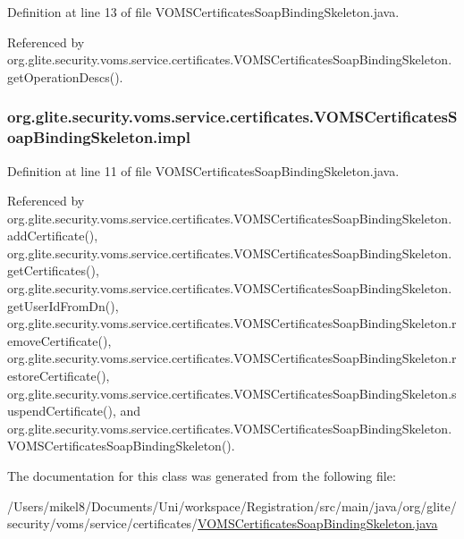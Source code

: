 Definition at line 13 of file VOMSCertificatesSoapBindingSkeleton.java.



Referenced by org.glite.security.voms.service.certificates.VOMSCertificatesSoapBindingSkeleton.getOperationDescs().

\hypertarget{classorg_1_1glite_1_1security_1_1voms_1_1service_1_1certificates_1_1VOMSCertificatesSoapBindingSkeleton_a2d621dce09a90972e8409a0dc9936638}{
\subsubsection[{impl}]{ {\bf org.glite.security.voms.service.certificates.VOMSCertificatesSoapBindingSkeleton.impl}}}
\label{classorg_1_1glite_1_1security_1_1voms_1_1service_1_1certificates_1_1VOMSCertificatesSoapBindingSkeleton_a2d621dce09a90972e8409a0dc9936638}


Definition at line 11 of file VOMSCertificatesSoapBindingSkeleton.java.



Referenced by org.glite.security.voms.service.certificates.VOMSCertificatesSoapBindingSkeleton.addCertificate(), org.glite.security.voms.service.certificates.VOMSCertificatesSoapBindingSkeleton.getCertificates(), org.glite.security.voms.service.certificates.VOMSCertificatesSoapBindingSkeleton.getUserIdFromDn(), org.glite.security.voms.service.certificates.VOMSCertificatesSoapBindingSkeleton.removeCertificate(), org.glite.security.voms.service.certificates.VOMSCertificatesSoapBindingSkeleton.restoreCertificate(), org.glite.security.voms.service.certificates.VOMSCertificatesSoapBindingSkeleton.suspendCertificate(), and org.glite.security.voms.service.certificates.VOMSCertificatesSoapBindingSkeleton.VOMSCertificatesSoapBindingSkeleton().



The documentation for this class was generated from the following file:\begin{DoxyCompactItemize}
\item 
/Users/mikel8/Documents/Uni/workspace/Registration/src/main/java/org/glite/security/voms/service/certificates/\hyperlink{VOMSCertificatesSoapBindingSkeleton_8java}{VOMSCertificatesSoapBindingSkeleton.java}\end{DoxyCompactItemize}
